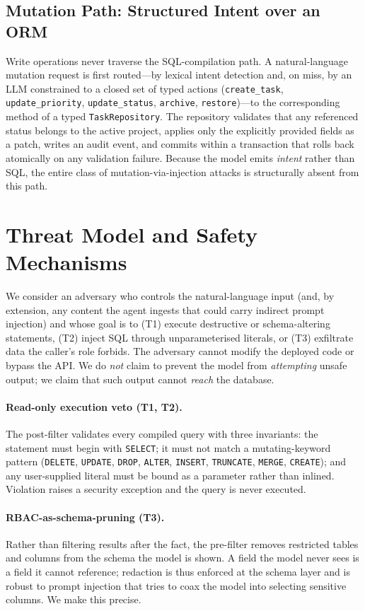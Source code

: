 \documentclass[runningheads]{llncs}
\begin{document}
\subsection{Mutation Path: Structured Intent over an ORM}
Write operations never traverse the SQL-compilation path. A natural-language mutation request is first routed---by lexical intent detection and, on miss, by an LLM constrained to a closed set of typed actions (\texttt{create\_task}, \texttt{update\_priority}, \texttt{update\_status}, \texttt{archive}, \texttt{restore})---to the corresponding method of a typed \texttt{TaskRepository}. The repository validates that any referenced status belongs to the active project, applies only the explicitly provided fields as a patch, writes an audit event, and commits within a transaction that rolls back atomically on any validation failure. Because the model emits \emph{intent} rather than SQL, the entire class of mutation-via-injection attacks is structurally absent from this path.

\section{Threat Model and Safety Mechanisms}
\label{sec:threat}
We consider an adversary who controls the natural-language input (and, by extension, any content the agent ingests that could carry indirect prompt injection) and whose goal is to (T1) execute destructive or schema-altering statements, (T2) inject SQL through unparameterised literals, or (T3) exfiltrate data the caller's role forbids. The adversary cannot modify the deployed code or bypass the API. We do \emph{not} claim to prevent the model from \emph{attempting} unsafe output; we claim that such output cannot \emph{reach} the database.

\paragraph{Read-only execution veto (T1, T2).} The post-filter validates every compiled query with three invariants: the statement must begin with \texttt{SELECT}; it must not match a mutating-keyword pattern (\texttt{DELETE}, \texttt{UPDATE}, \texttt{DROP}, \texttt{ALTER}, \texttt{INSERT}, \texttt{TRUNCATE}, \texttt{MERGE}, \texttt{CREATE}); and any user-supplied literal must be bound as a parameter rather than inlined. Violation raises a security exception and the query is never executed.

\paragraph{RBAC-as-schema-pruning (T3).} Rather than filtering results after the fact, the pre-filter removes restricted tables and columns from the schema the model is shown. A field the model never sees is a field it cannot reference; redaction is thus enforced at the schema layer and is robust to prompt injection that tries to coax the model into selecting sensitive columns. We make this precise.
\end{document}
